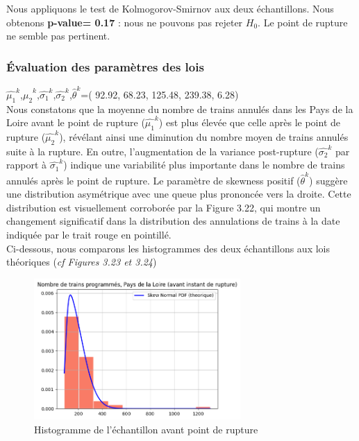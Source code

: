 {Nous appliquons le test de Kolmogorov-Smirnov aux deux échantillons. Nous obtenons \textbf{p-value= 0.17 }: nous ne pouvons pas rejeter $H_0$. Le point de rupture ne semble pas pertinent.

\subsubsection{Évaluation des paramètres des lois}

$\hat{\mu_1}^k$,$\hat{\mu_2}^k$,$\hat{\sigma_1}^k$,$\hat{\sigma_2}^k$,$\hat{\theta}^k$=( 92.92,  68.23, 125.48, 239.38, 6.28)\\

Nous constatons que la moyenne du nombre de trains annulés dans les Pays de la Loire avant le point de rupture ($\hat{\mu_1}^k$) est plus élevée que celle après le point de rupture ($\hat{\mu_2}^k$), révélant ainsi une diminution du nombre moyen de trains annulés suite à la rupture. En outre, l'augmentation de la variance post-rupture ($\hat{\sigma_2}^k$ par rapport à $\hat{\sigma_1}^k$) indique une variabilité plus importante dans le nombre de trains annulés après le point de rupture. Le paramètre de skewness positif ($\hat{\theta}^k$) suggère une distribution asymétrique avec une queue plus prononcée vers la droite. Cette distribution est visuellement corroborée par la Figure 3.22, qui montre un changement significatif dans la distribution des annulations de trains à la date indiquée par le trait rouge en pointillé.\\

Ci-dessous, nous comparons les histogrammes des deux échantillons aux lois théoriques (\textit{cf Figures 3.23 et 3.24})

\begin{figure}[H]
  \centering
  \includegraphics[width=0.7\textwidth]{image/PL-FIG10.png}
  \caption{Histogramme de l'échantillon avant point de rupture}
\end{figure}

}
